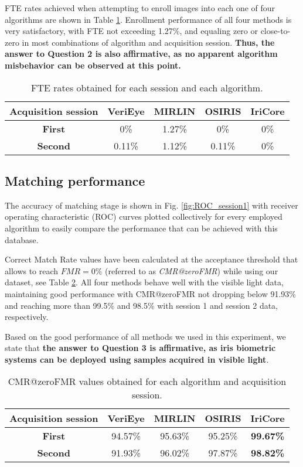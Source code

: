 \documentclass[10pt,twocolumn,letterpaper]{article}
\begin{document}
FTE rates achieved when attempting to enroll images into each one of four algorithms are shown in Table \ref{table:FTE}. Enrollment performance of all four methods is very satisfactory, with FTE not exceeding 1.27\%, and equaling zero or close-to-zero in most combinations of algorithm and acquisition session. \textbf{Thus, the answer to Question 2 is also affirmative, as no apparent algorithm misbehavior can be observed at this point.}

\begin{table}[!ht]
\renewcommand{\arraystretch}{1.1}
\caption{FTE rates obtained for each session and each algorithm.}
\vskip0.2cm
\label{table:FTE}
\centering\footnotesize
\begin{tabular}[t]{|c|c|c|c|c|}
\hline
\textbf{Acquisition session} & {VeriEye} & {MIRLIN} & OSIRIS & IriCore \\
\hline
\hline
\textbf{First} & 0\% & 1.27\%  & 0\% & 0\% \\
\hline
\textbf{Second} & 0.11\% & 1.12\%  & 0.11\% & 0\% \\
\hline
\end{tabular}
\end{table}

\subsection{Matching performance}

The accuracy of matching stage is shown in Fig. \ref{fig:ROC_session1} with receiver operating characteristic (ROC) curves plotted collectively for every employed algorithm to easily compare the performance that can be achieved with this database.

Correct Match Rate values have been calculated at the acceptance threshold that allows to reach $FMR=0\%$ (referred to as \emph{CMR@zeroFMR}) while using our dataset, see Table \ref{table:CMR}. All four methods behave well with the visible light data, maintaining good performance with CMR@zeroFMR not dropping below 91.93\% and reaching more than 99.5\% and 98.5\% with session 1 and session 2 data, respectively.

Based on the good performance of all methods we used in this experiment, we state that \textbf{the answer to Question 3 is affirmative, as iris biometric systems can be deployed using samples acquired in visible light}.

\begin{table}[!ht]
\renewcommand{\arraystretch}{1.1}
\caption{CMR@zeroFMR values obtained for each algorithm and acquisition session.}
\vskip0.2cm
\label{table:CMR}
\centering\footnotesize
\begin{tabular}[t]{|c|c|c|c|c|}
\hline
\textbf{Acquisition session} & {VeriEye} & {MIRLIN} & OSIRIS & IriCore \\
\hline
\hline
\textbf{First} & 94.57\% & 95.63\%  & 95.25\% & \textbf{99.67\%} \\
\hline
\textbf{Second} & 91.93\% & 96.02\%  & 97.87\% & \textbf{98.82\%} \\
\hline
\end{tabular}
\end{table}
\end{document}
